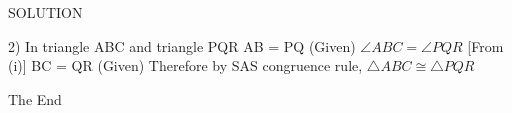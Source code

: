 \documentclass[11pt]{beamer}
\begin{document}
\begin{frame}{SOLUTION}

\begin{flushleft}

        2) In triangle ABC and triangle PQR
        \newline
        \newline
        AB = PQ  (Given)
        \newline
        $\angle ABC = \angle PQR$ [From (i)]
        \newline
         BC = QR  (Given) 
        \newline 
        \newline
        Therefore by SAS congruence rule, $\triangle  ABC  \cong   \triangle  PQR$ 
        

\end{flushleft}
    
\end{frame}


\begin{frame}
\huge{\centerline{The End}}
\end{frame}
\end{document}
